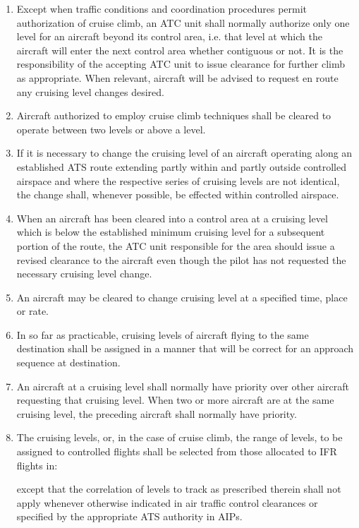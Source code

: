 \begin{enumerate}
    \item Except when traffic conditions and coordination procedures permit authorization of cruise climb, an ATC unit shall normally authorize only one level for an aircraft beyond its control area, i.e. that level at which the aircraft will enter the next control area whether contiguous or not. It is the responsibility of the accepting ATC unit to issue clearance for further climb as appropriate. When relevant, aircraft will be advised to request en route any cruising level changes desired.
    \item Aircraft authorized to employ cruise climb techniques shall be cleared to operate between two levels or above a level.
    \item If it is necessary to change the cruising level of an aircraft operating along an established ATS route extending partly within and partly outside controlled airspace and where the respective series of cruising levels are not identical, the change shall, whenever possible, be effected within controlled airspace.
    \item When an aircraft has been cleared into a control area at a cruising level which is below the established minimum cruising level for a subsequent portion of the route, the ATC unit responsible for the area should issue a revised clearance to the aircraft even though the pilot has not requested the necessary cruising level change.
    \item An aircraft may be cleared to change cruising level at a specified time, place or rate.
    \item In so far as practicable, cruising levels of aircraft flying to the same destination shall be assigned in a manner that will be correct for an approach sequence at destination.
    \item An aircraft at a cruising level shall normally have priority over other aircraft requesting that cruising level. When two or more aircraft are at the same cruising level, the preceding aircraft shall normally have priority.
    \item The cruising levels, or, in the case of cruise climb, the range of levels, to be assigned to controlled flights shall be selected from those allocated to IFR flights in:
    

    \noindent except that the correlation of levels to track as prescribed therein shall not apply whenever otherwise indicated in air traffic control clearances or specified by the appropriate ATS authority in AIPs.
\end{enumerate}

